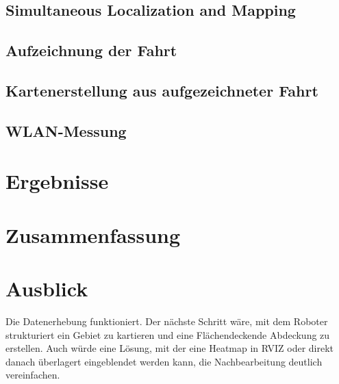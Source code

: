 \documentclass{scrartcl}%
\begin{document}
\subsection{Simultaneous Localization and Mapping}

\subsection{Aufzeichnung der Fahrt}

\subsection{Kartenerstellung aus aufgezeichneter Fahrt}

\subsection{WLAN-Messung}

\newpage
\section{Ergebnisse}

\newpage
\section{Zusammenfassung}

\newpage
\section{Ausblick}
Die Datenerhebung funktioniert. Der nächste Schritt wäre, mit dem Roboter strukturiert ein Gebiet zu kartieren und eine Flächendeckende Abdeckung zu erstellen. Auch würde eine Lösung, mit der eine Heatmap in RVIZ oder direkt danach überlagert eingeblendet werden kann, die Nachbearbeitung deutlich vereinfachen.


\newpage
\begin{flushleft}
	\printbibliography
\end{flushleft}
\end{document}
